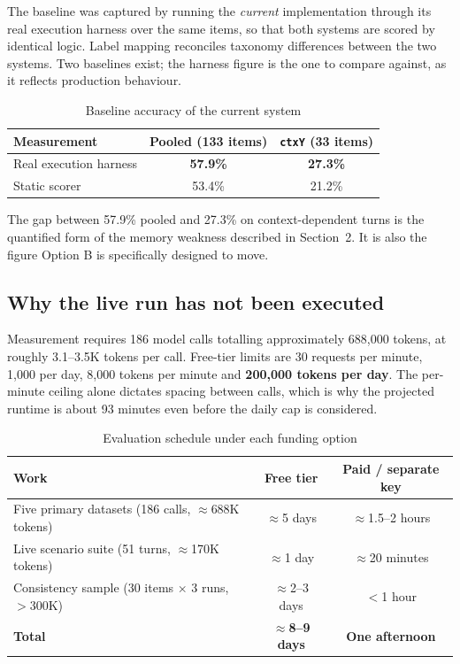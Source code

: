 \documentclass[11pt,a4paper]{article}
\newcommand{\fn}[1]{\texttt{\small #1}}
\begin{document}
The baseline was captured by running the \emph{current} implementation through its real
execution harness over the same items, so that both systems are scored by identical logic.
Label mapping reconciles taxonomy differences between the two systems. Two baselines exist;
the harness figure is the one to compare against, as it reflects production behaviour.

\begin{table}[H]
\centering
\caption{Baseline accuracy of the current system}
\small
\begin{tabular}{@{}l c c@{}}
\toprule
\textbf{Measurement} & \textbf{Pooled (133 items)} & \textbf{\fn{ctxY} (33 items)}\\
\midrule
Real execution harness & \textbf{57.9\%} & \textbf{27.3\%}\\
Static scorer & 53.4\% & 21.2\%\\
\bottomrule
\end{tabular}
\end{table}

The gap between 57.9\% pooled and 27.3\% on context-dependent turns is the quantified form of
the memory weakness described in Section~2. It is also the figure Option B is specifically
designed to move.

\subsection{Why the live run has not been executed}

Measurement requires 186 model calls totalling approximately 688{,}000 tokens, at roughly
3.1--3.5K tokens per call. Free-tier limits are 30 requests per minute, 1{,}000 per day,
8{,}000 tokens per minute and \textbf{200{,}000 tokens per day}. The per-minute ceiling alone
dictates spacing between calls, which is why the projected runtime is about 93 minutes even
before the daily cap is considered.

\begin{table}[H]
\centering
\caption{Evaluation schedule under each funding option}
\small
\begin{tabularx}{\textwidth}{@{}>{\raggedright\arraybackslash}X c c@{}}
\toprule
\textbf{Work} & \textbf{Free tier} & \textbf{Paid / separate key}\\
\midrule
Five primary datasets (186 calls, $\approx$688K tokens) & $\approx$5 days & $\approx$1.5--2 hours\\
Live scenario suite (51 turns, $\approx$170K tokens)    & $\approx$1 day  & $\approx$20 minutes\\
Consistency sample (30 items $\times$ 3 runs, $>$300K)  & $\approx$2--3 days & $<$1 hour\\
\midrule
\textbf{Total} & \textbf{$\approx$8--9 days} & \textbf{One afternoon}\\
\bottomrule
\end{tabularx}
\end{table}
\end{document}
